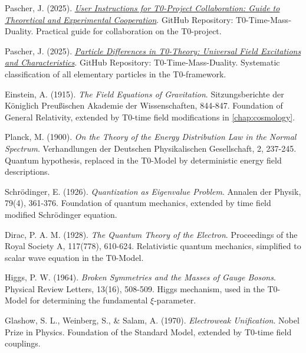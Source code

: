 \documentclass[12pt,a4paper]{report}
\newcommand{\xipar}{\xi}      %
\begin{document}
\begin{thebibliography}{50}
		Pascher, J. (2025). \href{https://github.com/jpascher/T0-Time-Mass-Duality/blob/main/2/pdf/User_Instructions_for_T0-Project_CollaborationEn.pdf}{\textit{User Instructions for T0-Project Collaboration: Guide to Theoretical and Experimental Cooperation}}. GitHub Repository: T0-Time-Mass-Duality. Practical guide for collaboration on the T0-project.
		
		Pascher, J. (2025). \href{https://github.com/jpascher/T0-Time-Mass-Duality/blob/main/2/pdf/Particle_Differences_in_T0_Theory_LaTeX_DocumentEn.pdf}{\textit{Particle Differences in T0-Theory: Universal Field Excitations and Characteristics}}. GitHub Repository: T0-Time-Mass-Duality. Systematic classification of all elementary particles in the T0-framework.
		
		Einstein, A. (1915). \textit{The Field Equations of Gravitation}. Sitzungsberichte der Königlich Preußischen Akademie der Wissenschaften, 844-847. Foundation of General Relativity, extended by T0-time field modifications in \autoref{chap:cosmology}.
		
		Planck, M. (1900). \textit{On the Theory of the Energy Distribution Law in the Normal Spectrum}. Verhandlungen der Deutschen Physikalischen Gesellschaft, 2, 237-245. Quantum hypothesis, replaced in the T0-Model by deterministic energy field descriptions.
		
		Schrödinger, E. (1926). \textit{Quantization as Eigenvalue Problem}. Annalen der Physik, 79(4), 361-376. Foundation of quantum mechanics, extended by time field modified Schrödinger equation.
		
		Dirac, P. A. M. (1928). \textit{The Quantum Theory of the Electron}. Proceedings of the Royal Society A, 117(778), 610-624. Relativistic quantum mechanics, simplified to scalar wave equation in the T0-Model.
		
		Higgs, P. W. (1964). \textit{Broken Symmetries and the Masses of Gauge Bosons}. Physical Review Letters, 13(16), 508-509. Higgs mechanism, used in the T0-Model for determining the fundamental $\xipar$-parameter.
		
		Glashow, S. L., Weinberg, S., \& Salam, A. (1970). \textit{Electroweak Unification}. Nobel Prize in Physics. Foundation of the Standard Model, extended by T0-time field couplings.
		

\end{thebibliography}
\end{document}

